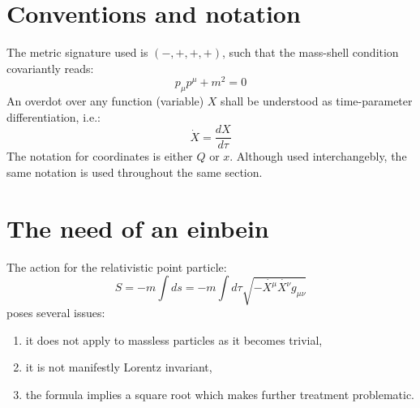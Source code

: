 \documentclass[a4paper,10pt]{article}
\numberwithin{equation}{section}
\begin{document}
\begin{appendices}


\section{Conventions and notation}
The metric signature used is $(-,+,+,+)$, such that the mass-shell condition covariantly reads:
\begin{equation}
p_\mu p^\mu + m^2 = 0
\end{equation}
An overdot over any function (variable) $X$ shall be understood as time-parameter differentiation, i.e.:
\begin{equation}
\dot{X} = \dfrac{d X}{d \tau}
\end{equation}
The notation for coordinates is either $Q$ or $x$. Although used interchangebly, the same notation is used throughout the same section.


\section{The need of an einbein}\label{einbeinexplained}
The action for the relativistic point particle:
\begin{equation}
S = - m \int ds = - m \int d\tau \sqrt{-\dot{X^\mu}\dot{X^\nu}g_{\mu\nu}}
\label{basicaction}
\end{equation}
poses several issues:
\begin{enumerate}
    \item it does not apply to massless particles as it becomes trivial,
    \item it is not manifestly Lorentz invariant,
    \item the formula implies a square root which makes further treatment problematic.
\end{enumerate}


\end{appendices}
\end{document}

